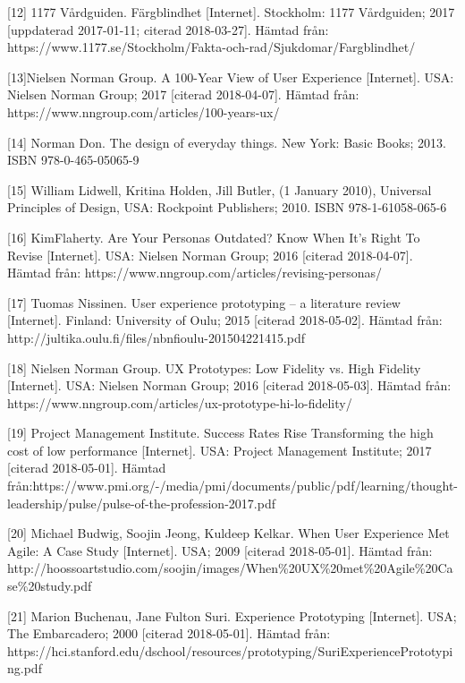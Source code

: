 \documentclass[12pt]{kththesis}
\begin{document}
[12] 1177 Vårdguiden. Färgblindhet [Internet]. Stockholm: 1177 Vårdguiden; 2017 [uppdaterad 2017-01-11; citerad 2018-03-27]. Hämtad från:\newline 
https://www.1177.se/Stockholm/Fakta-och-rad/Sjukdomar/Fargblindhet/

[13]Nielsen Norman Group. A 100-Year View of User Experience [Internet].  USA: Nielsen Norman Group; 2017 [citerad 2018-04-07]. Hämtad från:  https://www.nngroup.com/articles/100-years-ux/

[14] Norman Don. The design of everyday things. New York: Basic Books; 2013. ISBN 978-0-465-05065-9 

[15] William Lidwell, Kritina Holden, Jill Butler, (1 January 2010), Universal Principles of Design, USA: Rockpoint Publishers; 2010. ISBN 978-1-61058-065-6

[16] KimFlaherty. Are Your Personas Outdated? Know When It’s Right To Revise [Internet]. USA: Nielsen Norman Group; 2016 [citerad 2018-04-07]. Hämtad från:  https://www.nngroup.com/articles/revising-personas/ 

[17] Tuomas Nissinen. User experience prototyping – a literature review [Internet]. Finland: University of Oulu; 2015 [citerad 2018-05-02]. Hämtad från: http://jultika.oulu.fi/files/nbnfioulu-201504221415.pdf 

[18] Nielsen Norman Group. UX Prototypes: Low Fidelity vs. High Fidelity [Internet].  USA: Nielsen Norman Group; 2016 [citerad 2018-05-03]. Hämtad från: https://www.nngroup.com/articles/ux-prototype-hi-lo-fidelity/ 

[19] Project Management Institute. Success Rates Rise Transforming the high cost of low performance [Internet]. USA:  Project Management Institute; 2017 [citerad 2018-05-01]. Hämtad från:\newline https://www.pmi.org/-\newline/media/pmi/documents/public/pdf/learning/thought-leadership/pulse/pulse-of-the-profession-2017.pdf

[20] Michael Budwig, Soojin Jeong, Kuldeep Kelkar. When User Experience Met Agile: A Case Study [Internet]. USA; 2009 [citerad 2018-05-01]. Hämtad från: http://hoossoartstudio.com/soojin/images/When\%\newline20UX\%20met\%20Agile\%20Case\%20study.pdf

[21] Marion Buchenau, Jane Fulton Suri. Experience Prototyping [Internet]. USA; The Embarcadero; 2000 [citerad 2018-05-01]. Hämtad från: https://hci.stanford.edu/dschool/resources/prototyping\newline/SuriExperiencePrototyping.pdf
  
\end{document}
